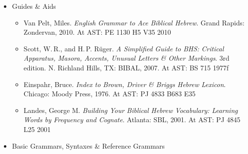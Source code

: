 \documentclass[titlepage]{article}
\begin{document}
\begin{itemize}
  \item Guides \& Aids

    \begin{itemize}
      \item
        Van Pelt, Miles. \emph{English Grammar to Ace Biblical Hebrew}.
        Grand Rapids: Zondervan, 2010. At AST: PE 1130 H5 V35 2010
      \item
        Scott, W.\,R., and H.\,P. Rüger. \emph{A Simplified Guide to BHS:
        Critical Apparatus, Masora, Accents, Unusual Letters \& Other
        Markings}. 3rd edition. N. Richland Hills, TX: BIBAL, 2007.
        At AST: BS 715 1977f
      \item
        Einspahr, Bruce. \emph{Index to Brown, Driver \& Briggs Hebrew Lexicon}.
        Chicago: Moody Press, 1976. At AST: PJ 4833 B683 E35
      \item
        Landes, George M. \emph{Building Your Biblical Hebrew Vocabulary: Learning Words by Frequency and Cognate}.
        Atlanta: SBL, 2001. At AST: PJ 4845 L25 2001
    \end{itemize}

  \item Basic Grammars, Syntaxes \& Reference Grammars


\end{itemize}
\end{document}
